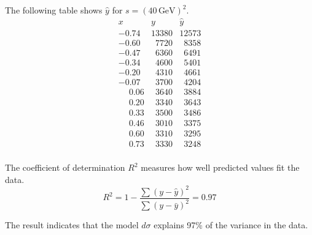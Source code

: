 The following table shows $\hat y$ for $s=(40\,\text{GeV})^2$.
\begin{equation*}
\begin{matrix}
x & y & \hat{y}\\
-0.74 & 13380 & 12573\\
-0.60 & \phantom{0}7720 & \phantom{0}8358\\
-0.47 & \phantom{0}6360 & \phantom{0}6491\\
-0.34 & \phantom{0}4600 & \phantom{0}5401\\
-0.20 & \phantom{0}4310 & \phantom{0}4661\\
-0.07 & \phantom{0}3700 & \phantom{0}4204\\
\phantom{+}0.06 & \phantom{0}3640 & \phantom{0}3884\\
\phantom{+}0.20 & \phantom{0}3340 & \phantom{0}3643\\
\phantom{+}0.33 & \phantom{0}3500 & \phantom{0}3486\\
\phantom{+}0.46 & \phantom{0}3010 & \phantom{0}3375\\
\phantom{+}0.60 & \phantom{0}3310 & \phantom{0}3295\\
\phantom{+}0.73 & \phantom{0}3330 & \phantom{0}3248\\
\end{matrix}
\end{equation*}

The coefficient of determination $R^2$ measures how well predicted values fit the data.
\begin{equation*}
R^2=1-\frac{\sum(y-\hat{y})^2}{\sum(y-\bar{y})^2}=0.97
\end{equation*}

The result indicates that the model $d\sigma$ explains 97\% of the variance in the data.


